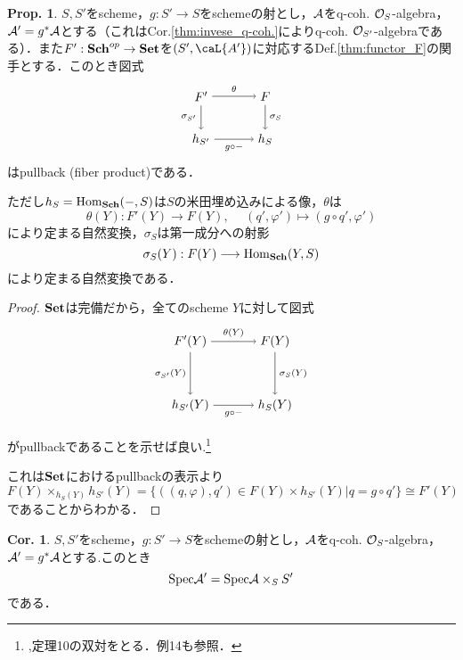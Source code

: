 \documentclass[dvipdfmx,b5paper,papersize]{jsarticle}
\theoremstyle{definition}
\newtheorem{prop}[thm]{Prop.}
\newtheorem{cor}[thm]{Cor.}
\begin{document}
\begin{prop}\label{thm:pullback}
  $S,S'$をscheme，$g:S' \to S$をschemeの射とし，$\cal{A}$をq-coh. ${\cal{O}}_S$-algebra，${\cal{A'}}=g^*{\cal{A}}$とする（これは{\rm Cor.\ref{thm:invese_q-coh.}}によりq-coh. ${\cal{O}}_{S'}$-algebraである）．また$F':{\bf Sch}^{op} \to {\bf Set}$を$(S',{\caL{A'}})$に対応する{\rm Def.\ref{thm:functor_F}}の関手とする．このとき図式
  \[
    \begin{tikzpicture}[auto,->]
      \node (a) at (0,1.2) {$F'$}; \node (x) at (1.8,1.2) {$F$};
      \node (b) at (0,0) {$h_{S'}$}; \node (y) at (1.8,0) {$h_{S}$};
      \draw (a) -- node {$\scriptstyle \theta$} (x);
      \draw (x) -- node {$\scriptstyle \sigma_{S}$} (y);
      \draw (a) -- node[swap] {$\scriptstyle \sigma_{S'}$} (b);
      \draw (b) -- node[swap] {$\scriptstyle g \circ -$} (y);
    \end{tikzpicture}
  \]
  はpullback (fiber product)である．

  ただし$h_{S}={\rm Hom}_{\bf Sch}(-,S)$は$S$の米田埋め込みによる像，$\theta$は
  \[
    \theta(Y):F'(Y) \longrightarrow F(Y), \hspace{15pt}(q',\varphi') \longmapsto (g \circ q',\varphi')
  \]
  により定まる自然変換，$\sigma_{S}$は第一成分への射影
  \[
    \sigma_S(Y):F(Y)\longrightarrow{\rm Hom}_{\bf Sch}(Y,S)
  \]
  により定まる自然変換である．
\end{prop}
\begin{proof}
  ${\bf Set}$は完備だから，全てのscheme $Y$に対して図式
  \[
    \begin{tikzpicture}[auto,->]
      \node (a) at (0,1.8) {$F'(Y)$}; \node (x) at (2.4,1.8) {$F(Y)$};
      \node (b) at (0,0) {$h_{S'}(Y)$}; \node (y) at (2.4,0) {$h_{S}(Y)$};
      \draw (a) -- node {$\scriptstyle \theta(Y)$} (x);
      \draw (x) -- node {$\scriptstyle \sigma_{S}(Y)$} (y);
      \draw (a) -- node[swap] {$\scriptstyle \sigma_{S'}(Y)$} (b);
      \draw (b) -- node[swap] {$\scriptstyle g \circ -$} (y);
    \end{tikzpicture}
  \]

  がpullbackであることを示せば良い.\footnote{\cite{alg_d},定理10の双対をとる．例14も参照．}

  これは${\bf Set}$におけるpullbackの表示より
  \[
    F(Y)\times_{h_S(Y)} h_{S'}(Y)=\{((q,\varphi),q')\in F(Y)\times h_{S'}(Y)|q=g\circ q'\} \cong F'(Y)
  \]
  であることからわかる．
\end{proof}
\begin{cor}
  $S,S'$をscheme，$g:S' \to S$をschemeの射とし，$\cal{A}$をq-coh. ${\cal{O}}_S$-algebra，${\cal{A'}}=g^*{\cal{A}}$とする.このとき
  \[
  {\rm Spec}{\cal{A'}}={\rm Spec}{\cal{A}}\times_S S'
  \]
  である．
\end{cor}
\end{document}
